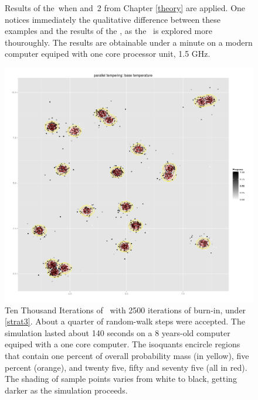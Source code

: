 \begin{figure}
\begin{minipage}[b]{.5\linewidth}
	\label{plotStrategy2}
	\end{minipage}
	\caption[\PT\, with \strat\,1 and \strat\,2]{Results of the \PT\,when  and \strat\,2 from Chapter \ref{theory} are applied. One notices immediately the qualitative difference between these examples and the results of the \MHalgo, as the \sspace\, is explored more thouroughly. The results are obtainable under a minute on a modern computer equiped with one core processor unit, 1.5 GHz.}\label{PTshort}
\end{figure}

\begin{figure}[ht]
	\centering 
	\includegraphics[width=\textwidth,keepaspectratio]{./img/PT10000Motivation.png}
	\caption[Ten Thousand Iterations of \PT]{Ten Thousand Iterations of \PT\, with 2500 iterations of burn-in, under \ref{strat3}. About a quarter of random-walk steps were accepted. The simulation lasted about 140 seconds on a 8 years-old computer equiped with a one core computer. The isoquants encircle regions that contain one percent of overall probability mass (in yellow), five percent (orange), and twenty five, fifty and seventy five (all in red). The shading of sample points varies from white to black, getting darker as the simulation proceeds.}\label{PTlong}
\end{figure}

